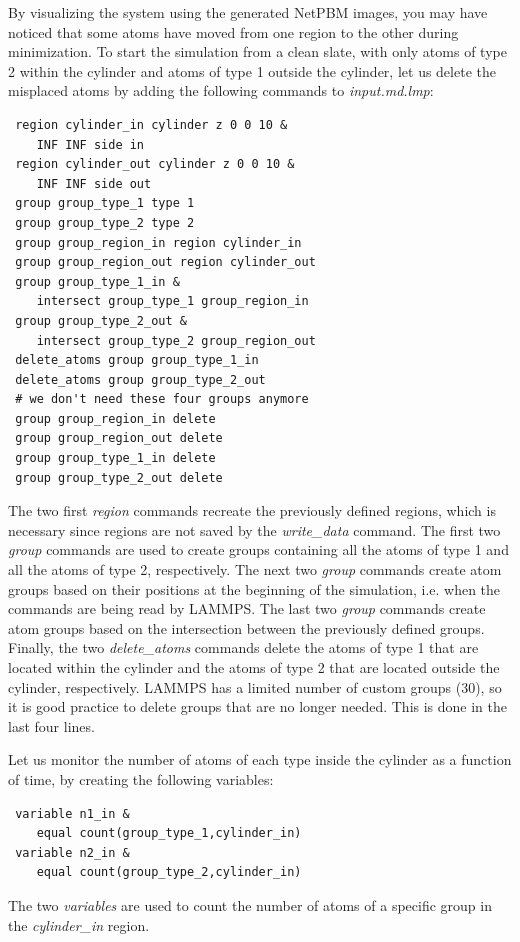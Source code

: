 \documentclass[9pt,tutorial]{livecoms}
\begin{document}
By visualizing the system using the generated NetPBM images, you may
have noticed that some atoms have moved from one region to the other
during minimization.  To start the simulation from a clean slate, with
only atoms of type 2 within the cylinder and atoms of type 1 outside the
cylinder, let us delete the misplaced atoms by adding the following
commands to \textit{input.md.lmp}:

{\normalsize
\begin{verbatim}
 region cylinder_in cylinder z 0 0 10 &
    INF INF side in
 region cylinder_out cylinder z 0 0 10 &
    INF INF side out
 group group_type_1 type 1
 group group_type_2 type 2
 group group_region_in region cylinder_in
 group group_region_out region cylinder_out
 group group_type_1_in &
    intersect group_type_1 group_region_in
 group group_type_2_out &
    intersect group_type_2 group_region_out
 delete_atoms group group_type_1_in
 delete_atoms group group_type_2_out
 # we don't need these four groups anymore
 group group_region_in delete
 group group_region_out delete
 group group_type_1_in delete
 group group_type_2_out delete
\end{verbatim}
}

The two first \textit{region} commands recreate the previously defined
regions, which is necessary since regions are not saved by the
\textit{write\_data} command.  The first two \textit{group} commands are
used to create groups containing all the atoms of type 1 and all the
atoms of type 2, respectively.  The next two \textit{group} commands
create atom groups based on their positions at the beginning of the
simulation, i.e. when the commands are being read by LAMMPS.  The last
two \textit{group} commands create atom groups based on the intersection
between the previously defined groups.  Finally, the two
\textit{delete\_atoms} commands delete the atoms of type 1 that are
located within the cylinder and the atoms of type 2 that are located
outside the cylinder, respectively.  LAMMPS has a limited number of
custom groups (30), so it is good practice to delete groups that are
no longer needed. This is done in the last four lines.

Let us monitor the number of atoms of each type inside the cylinder as a
function of time, by creating the following variables:
{\normalsize
\begin{verbatim}
 variable n1_in &
    equal count(group_type_1,cylinder_in)
 variable n2_in &
    equal count(group_type_2,cylinder_in)
\end{verbatim}
}
The two \textit{variables} are used to count the number of atoms of a specific
group in the \textit{cylinder\_in} region.
\end{document}
